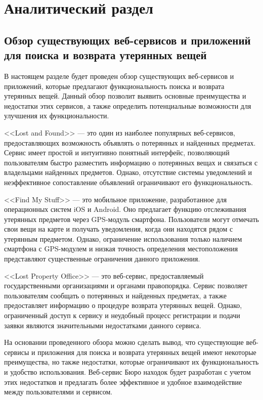 \documentclass{mirea-prog-lang}
\begin{document}
\section{Аналитический раздел}


\subsection{Обзор существующих веб-сервисов и приложений для поиска и возврата утерянных вещей}

В настоящем разделе будет проведен обзор существующих веб-сервисов 
и приложений, которые предлагают функциональность поиска 
и возврата утерянных вещей. Данный обзор позволит выявить 
основные преимущества и недостатки этих сервисов, 
а также определить потенциальные возможности для улучшения их функциональности.

<<Lost and Found>> --- это один из наиболее популярных веб-сервисов, 
предоставляющих возможность объявлять о потерянных и найденных предметах. 
Сервис имеет простой и интуитивно понятный интерфейс, 
позволяющий пользователям быстро разместить информацию 
о потерянных вещах и связаться с владельцами найденных предметов. 
Однако, отсутствие системы уведомлений и неэффективное сопоставление 
объявлений ограничивают его функциональность.

<<Find My Stuff>> --- это мобильное приложение, разработанное 
для операционных систем iOS и Android. Оно предлагает функцию отслеживания 
утерянных предметов через GPS-модуль смартфона. Пользователи могут отмечать 
свои вещи на карте и получать уведомления, когда они находятся рядом с утерянным предметом. 
Однако, ограничение использования только наличием смартфона с GPS-модулем 
и низкая точность определения местоположения представляют 
существенные ограничения данного приложения.

<<Lost Property Office>> --- это веб-сервис, предоставляемый 
государственными организациями и органами правопорядка. 
Сервис позволяет пользователям сообщать о потерянных 
и найденных предметах, а также предоставляет информацию 
о процедуре возврата утерянных вещей. Однако, 
ограниченный доступ к сервису и неудобный процесс регистрации 
и подачи заявки являются значительными недостатками данного сервиса.

На основании проведенного обзора можно сделать вывод, 
что существующие веб-сервисы и приложения для поиска и возврата 
утерянных вещей имеют некоторые преимущества, но также недостатки, 
которые ограничивают их функциональность и удобство использования. 
Веб-сервис Бюро находок будет разработан с учетом этих недостатков 
и предлагать более эффективное и удобное взаимодействие 
между пользователями и сервисом.
\end{document}
